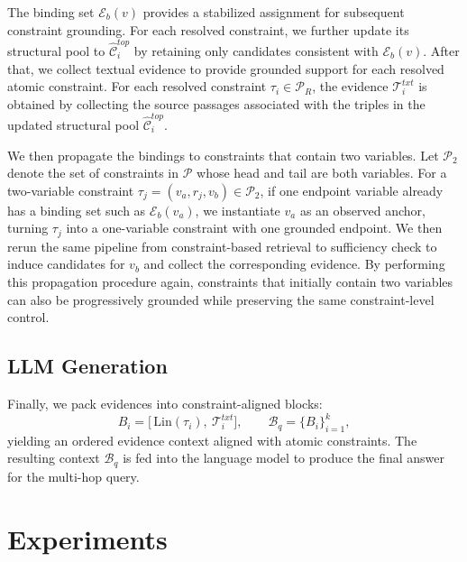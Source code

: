 \documentclass{article}
\theoremstyle{plain}
\theoremstyle{definition}
\theoremstyle{remark}
\begin{document}
The binding set $\mathcal{E}_b(v)$ provides a stabilized assignment for subsequent constraint grounding.
For each resolved constraint, we further update its structural pool to $\hat{\mathcal{C}}_i^{top}$ by retaining only candidates consistent with $\mathcal{E}_b(v)$.
After that, we collect textual evidence to provide grounded support for each resolved atomic constraint.
For each resolved constraint $\tau_i\in\mathcal{P}_R$, the evidence $\mathcal{T}_i^{txt}$ is obtained by collecting the source passages associated with the triples in the updated structural pool $\hat{\mathcal{C}}_i^{top}$.

We then propagate the bindings to constraints that contain two variables.
Let $\mathcal{P}_2$ denote the set of constraints in $\mathcal{P}$ whose head and tail are both variables.
For a two-variable constraint $\tau_j=(v_a,r_j,v_b)\in\mathcal{P}_2$, if one endpoint variable already has a binding set such as $\mathcal{E}_b(v_a)$,
we instantiate $v_a$ as an observed anchor, turning $\tau_j$ into a one-variable constraint with one grounded endpoint.
We then rerun the same pipeline from constraint-based retrieval to sufficiency check to induce candidates for $v_b$ and collect the corresponding evidence.
By performing this propagation procedure again, constraints that initially contain two variables can also be progressively grounded while preserving the same constraint-level control.


\subsection{LLM Generation}
Finally, we pack evidences into constraint-aligned blocks:
\begin{equation}
B_i=\big[\,\mathrm{Lin}(\tau_i),\ \mathcal{T}_i^{txt}\big],\qquad
\mathcal{B}_q=\{B_i\}_{i=1}^{k},
\label{eq:evidence_blocks}
\end{equation}
yielding an ordered evidence context aligned with atomic constraints.
The resulting context $\mathcal{B}_q$ is fed into the language model to produce the final answer for the multi-hop query.



\section{Experiments}
\end{document}
